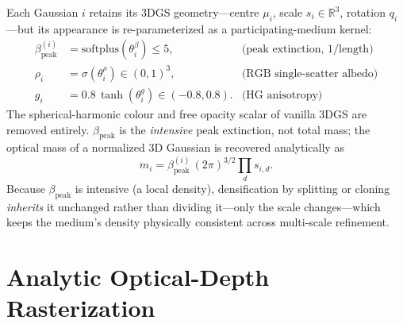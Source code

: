 \documentclass[sigconf]{acmart}
\newcommand{\bpeak}{\beta_{\mathrm{peak}}}
\begin{document}
Each Gaussian $i$ retains its 3DGS geometry---centre $\mu_i$, scale $s_i \in
\mathbb{R}^3$, rotation $q_i$---but its appearance is re-parameterized as a
participating-medium kernel:
\begin{align}
  \bpeak^{(i)} &= \mathrm{softplus}(\theta^\beta_i) \le 5,
    &\text{(peak extinction, $1/\text{length}$)}\\
  \rho_i       &= \sigma(\theta^\rho_i) \in (0,1)^3,
    &\text{(RGB single-scatter albedo)}\\
  g_i          &= 0.8\,\tanh(\theta^g_i) \in (-0.8, 0.8).
    &\text{(HG anisotropy)}
\end{align}
The spherical-harmonic colour and free opacity scalar of vanilla 3DGS are
removed entirely. $\bpeak$ is the \emph{intensive} peak extinction, not total
mass; the optical mass of a normalized 3D Gaussian is recovered analytically as
\begin{equation}
  m_i = \bpeak^{(i)} \,(2\pi)^{3/2} \prod_d s_{i,d}.
  \label{eq:mass}
\end{equation}
Because $\bpeak$ is intensive (a local density), densification by splitting or
cloning \emph{inherits} it unchanged rather than dividing it---only the scale
changes---which keeps the medium's density physically consistent across
multi-scale refinement.

\section{Analytic Optical-Depth Rasterization}
\label{sec:render}
\end{document}
